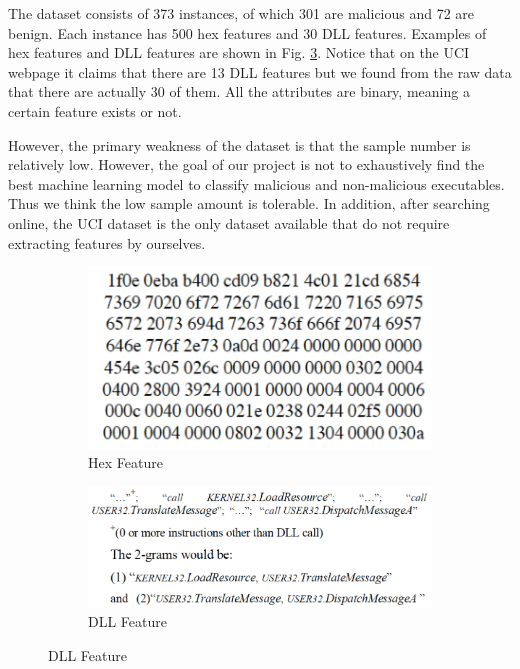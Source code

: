 \documentclass[11pt]{article}
\begin{document}
The dataset consists of 373 instances, of which 301 are malicious and 72 are benign. Each instance has 500 hex features and 30 DLL features. Examples of hex features and DLL features are shown in Fig. \ref{fig:hexDLL}. Notice that on the UCI webpage it claims that there are 13 DLL features but we found from the raw data that there are actually 30 of them. All the attributes are binary, meaning a certain feature exists or not. 

However, the primary weakness of the dataset is that the sample number is relatively low. However, the goal of our project is not to exhaustively find the best machine learning model to classify malicious and non-malicious executables. Thus we think the low sample amount is tolerable. In addition, after searching online, the UCI dataset is the only dataset available that do not require extracting features by ourselves.



\begin{figure}[htbp]
\centering
\begin{subfigure}[htbp]{0.4\columnwidth}
\includegraphics*[width=\textwidth]{fig/hex}
\caption{Hex Feature}
\label{fig:hex}
\end{subfigure}
\hfill
\begin{subfigure}[htbp]{0.57\columnwidth}
\includegraphics*[width=\textwidth]{fig/DLL}
\caption{DLL Feature}
\label{fig:DLL}
\end{subfigure}
\label{fig:hexDLL}
\end{figure}
\end{document}
